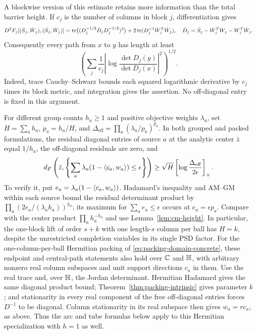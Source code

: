 A blockwise version of this estimate retains more information than the
total barrier height.  If $c_j$ is the number of columns in block
$j$, differentiation gives
\[
 D^2F_j[(\dot S_j,\dot W_j),(\dot S_j,\dot W_j)]
 =\operatorname{tr}\bigl((D_j^{-1/2}\dot D_jD_j^{-1/2})^2\bigr)
   +2\operatorname{tr}(D_j^{-1}\dot W_j^T\dot W_j),
 \quad
 \dot D_j=\dot S_j-\dot W_j^TW_j-W_j^T\dot W_j.
\]
Consequently every path from $x$ to $y$ has length at least
\begin{equation}\label{eq:cm-packed-log-vector}
 \left(\sum_j\frac1{c_j}
 \left|\log\frac{\det D_j(y)}{\det D_j(x)}\right|^2\right)^{1/2}.
\end{equation}
Indeed, trace Cauchy--Schwarz bounds each squared logarithmic
derivative by $c_j$ times its block metric, and integration gives
the assertion.  No off-diagonal entry is fixed in this argument.

For different group counts $h_a\geq1$ and positive objective weights
$\lambda_a$, set $H=\sum_ah_a$, $p_a=h_a/H$, and
$\Delta_{\mathrm{eff}}=\prod_a(\lambda_a/p_a)^{p_a}$.
In both grouped and packed formulations, the residual diagonal entries
of source $a$ at the analytic center $\bar z$ equal $1/h_a$, the
off-diagonal residuals are zero, and
\begin{equation}\label{eq:cm-packed-entropy}
 d_F\left(\bar z,
 \left\{\sum_a\lambda_a(1-\langle c_a,w_a\rangle)\leq\epsilon\right\}\right)
 \geq\sqrt H\left[\log\frac{\Delta_{\mathrm{eff}}}{2\epsilon}\right]_+.
\end{equation}
To verify it, put $e_a=\lambda_a(1-\langle c_a,w_a\rangle)$.
Hadamard's inequality and AM--GM within each source bound the residual determinant product
by $\prod_a(2e_a/(\lambda_ah_a))^{h_a}$; its maximum for
$\sum_ae_a\leq\epsilon$ occurs at $e_a=\epsilon p_a$.
Compare with the center product $\prod_ah_a^{-h_a}$ and use
Lemma~\ref{lem:cm-height}.  In particular, the one-block lift of
order $s+k$ with one length-$s$ column per ball has $H=k$, despite the
unrestricted completion variables in its single PSD factor.
For the one-column-per-ball Hermitian packing of
\eqref{eq:packing-domain-concrete}, these endpoint and central-path
statements also hold over $\mathbb C$ and $\mathbb H$, with arbitrary nonzero real
column subspaces and unit support directions $c_a$ in them.  Use the real trace
and, over $\mathbb H$, the Jordan determinant.  Hermitian Hadamard gives the
same diagonal product bound; Theorem~\ref{thm:packing-intrinsic}
gives parameter $k$; and stationarity in every real component of the
free off-diagonal entries forces $D^{-1}$ to be diagonal.  Column
stationarity in its real subspace then gives $w_a=rc_a$, as above.
Thus the arc and tube formulas below apply to this Hermitian
specialization with $h=1$ as well.

